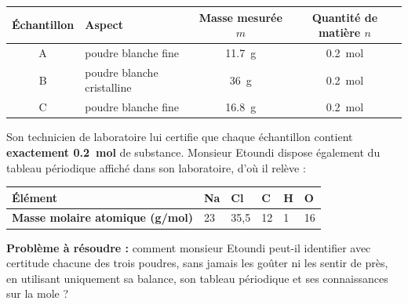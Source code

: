 \documentclass[11pt]{article}
\begin{document}
\begin{center}
\begin{tabularx}{\linewidth}{|c|X|c|c|}
\hline
\rowcolor{popblueL} \textbf{Échantillon} & \textbf{Aspect} & \textbf{Masse mesurée $m$} & \textbf{Quantité de matière $n$} \\
\hline
A & poudre blanche fine & \SI{11,7}{g} & \SI{0,2}{mol} \\
\hline
B & poudre blanche cristalline & \SI{36}{g} & \SI{0,2}{mol} \\
\hline
C & poudre blanche fine & \SI{16,8}{g} & \SI{0,2}{mol} \\
\hline
\end{tabularx}
\end{center}

Son technicien de laboratoire lui certifie que chaque échantillon contient \textbf{exactement \SI{0,2}{mol}} de substance. Monsieur Etoundi dispose également du tableau périodique affiché dans son laboratoire, d'où il relève :

\begin{center}
\begin{tabularx}{\linewidth}{|l|X|X|X|X|X|}
\hline
\rowcolor{popblueL} \textbf{Élément} & Na & Cl & C & H & O \\
\hline
\textbf{Masse molaire atomique (g/mol)} & 23 & 35,5 & 12 & 1 & 16 \\
\hline
\end{tabularx}
\end{center}

\textbf{Problème à résoudre :} comment monsieur Etoundi peut-il identifier avec certitude chacune des trois poudres, sans jamais les goûter ni les sentir de près, en utilisant uniquement sa balance, son tableau périodique et ses connaissances sur la mole ?
\end{document}
